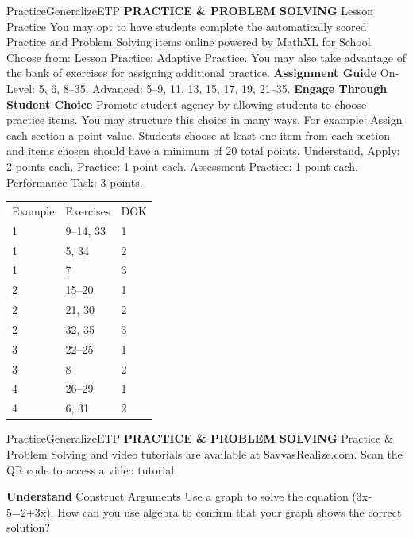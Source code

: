 \documentclass{article}
\newenvironment{item-analysis}{}{}      %
\newenvironment{practice}[2]{}{}        %
\newenvironment{te-addendum}[2]{}{}     %
\newcommand{\answer}[1]{}               %
\newcommand{\placeholder}[2]{}          %
\begin{document}
\begin{te-addendum}{Practice}{GeneralizeETP}
\textbf{PRACTICE \& PROBLEM SOLVING}
Lesson Practice You may opt to have students complete the automatically scored Practice and Problem Solving items online powered by MathXL for School.
Choose from: Lesson Practice; Adaptive Practice.
You may also take advantage of the bank of exercises for assigning additional practice.
\textbf{Assignment Guide}
On-Level: 5, 6, 8--35. Advanced: 5--9, 11, 13, 15, 17, 19, 21--35.
\textbf{Engage Through Student Choice}
Promote student agency by allowing students to choose practice items. You may structure this choice in many ways. For example:
Assign each section a point value. Students choose at least one item from each section and items chosen should have a minimum of 20 total points.
Understand, Apply: 2 points each. Practice: 1 point each. Assessment Practice: 1 point each. Performance Task: 3 points.
\end{te-addendum}
\begin{item-analysis}
\begin{tabular}{lll}
Example & Exercises & DOK \\
1 & 9--14, 33 & 1 \\
1 & 5, 34 & 2 \\
1 & 7 & 3 \\
2 & 15--20 & 1 \\
2 & 21, 30 & 2 \\
2 & 32, 35 & 3 \\
3 & 22--25 & 1 \\
3 & 8 & 2 \\
4 & 26--29 & 1 \\
4 & 6, 31 & 2 \\
\end{tabular}
\end{item-analysis}
\begin{te-addendum}{Practice}{GeneralizeETP}
\textbf{PRACTICE \& PROBLEM SOLVING}
Practice \& Problem Solving and video tutorials are available at SavvasRealize.com. Scan the QR code to access a video tutorial.
\placeholder{illustration}{Square QR code in the upper-right Practice and Problem Solving header beside Scan for Multimedia.}
\end{te-addendum}
\begin{practice}{5}{2}
\textbf{Understand} Construct Arguments Use a graph to solve the equation (3x-5=2+3x). How can you use algebra to confirm that your graph shows the correct solution?
\answer{no solution; Subtracting (3x) from both sides of the original equation gives (-5=2), which is false, so there is no solution.}
\end{practice}
\end{document}
